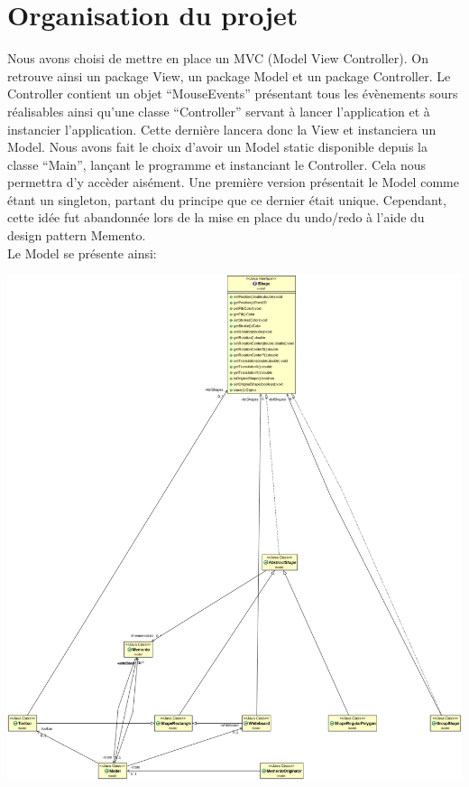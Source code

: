 \chapter{Organisation du projet}

Nous avons choisi de mettre en place un MVC (Model View Controller). On retrouve ainsi
un package View, un package Model et un package Controller. Le Controller contient
un objet ``MouseEvents'' présentant tous les évènements sours réalisables ainsi qu'une
classe ``Controller'' servant à lancer l'application et à instancier l'application.
Cette dernière lancera donc la View et instanciera un Model. Nous avons
fait le choix d'avoir un Model static disponible depuis la classe ``Main'', lançant
le programme et instanciant le Controller. Cela nous permettra d'y accèder aisément.
Une première version présentait le Model comme étant un singleton, partant du principe que ce dernier était unique. Cependant, cette idée fut abandonnée lors
de la mise en place du undo/redo à l'aide du design pattern Memento.
\\
Le Model se présente ainsi:

\hspace{2.3cm}\includegraphics[scale=0.145]{../images/uml_model.png}

